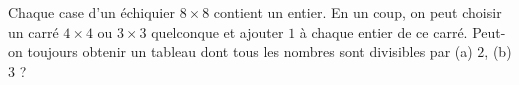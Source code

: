 Chaque case d'un échiquier $8 \times 8$ contient un entier. En un coup, on peut choisir un carré $4 \times 4$ ou $3 \times 3$ quelconque et ajouter $1$ à chaque entier de ce carré. Peut-on toujours obtenir un tableau dont tous les nombres sont divisibles par (a) $2$, (b) $3$ ?
